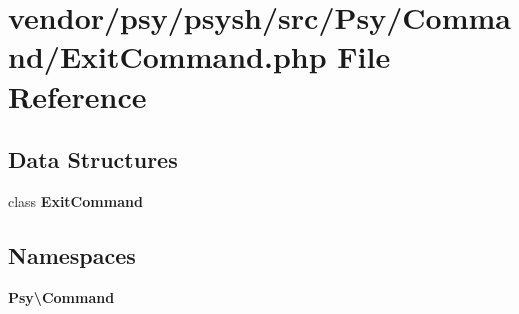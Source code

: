 \section{vendor/psy/psysh/src/\+Psy/\+Command/\+Exit\+Command.php File Reference}
\label{_exit_command_8php}
\subsection*{Data Structures}
\begin{DoxyCompactItemize}
\item 
class {\bf Exit\+Command}
\end{DoxyCompactItemize}
\subsection*{Namespaces}
\begin{DoxyCompactItemize}
\item 
 {\bf Psy\textbackslash{}\+Command}
\end{DoxyCompactItemize}
